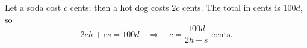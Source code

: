 Let a soda cost $c$ cents; then a hot dog costs $2c$ cents. The total in cents is $100d$, so
\[
2ch+cs=100d\quad\Longrightarrow\quad c=\boxed{\dfrac{100d}{2h+s}}\text{ cents}.
\]
